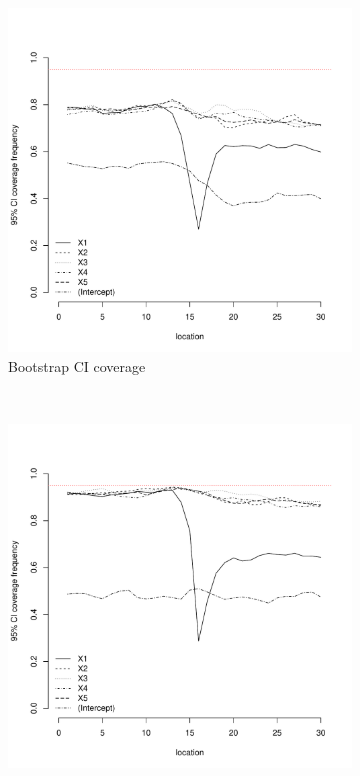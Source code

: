 \documentclass[authoryear, review, 11pt]{elsarticle}
\begin{document}
\begin{figure}
	\vspace{-30mm}
	\centering
	\begin{subfigure}[b]{0.45\textwidth}
	\centering
		\includegraphics[width=\textwidth]{../../figures/simulation/15.3.profile_bootstrap_coverage.pdf}
		\caption{Bootstrap CI coverage}
	\end{subfigure}%
	~ %
	\begin{subfigure}[b]{0.45\textwidth}
	\centering
		\includegraphics[width=\textwidth]{../../figures/simulation/15.3.profile_se_coverage.pdf}

\end{subfigure}
\end{figure}
\end{document}
